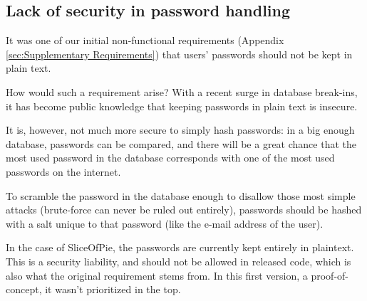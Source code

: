 \subsection{Lack of security in password handling}

It was one of our initial non-functional requirements (Appendix \ref{sec:Supplementary Requirements}) that
users' passwords should not be kept in plain text.

How would such a requirement arise? With a recent surge in database break-ins\cite{lulzsec0711}, it has
become public knowledge that keeping passwords in plain text is insecure.

It is, however, not much more secure to simply hash passwords: in a big enough database, passwords can be
compared, and there will be a great chance that the most used password in the database corresponds with one
of the most used passwords on the internet\cite{toppasswords}.

To scramble the password in the database enough to disallow those most simple attacks (brute-force can never
be ruled out entirely), passwords should be hashed with a salt unique to that password (like the e-mail address
of the user).

In the case of SliceOfPie, the passwords are currently kept entirely in plaintext. This is a security liability,
and should not be allowed in released code, which is also what the original requirement stems from. In this first
version, a proof-of-concept, it wasn't prioritized in the top.